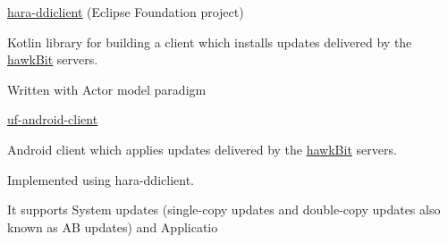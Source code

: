\newpage
{}


\begin{cventries}

  \cventry
    {\href{https://github.com/eclipse-hara/hara-ddiclient}{\underline{hara-ddiclient}} (Eclipse Foundation project)} %
    {} %
    {} %
    {} %
    {
    \begin{cvitems}
    		\item Kotlin library for building a client which installs updates delivered by the \href{https://eclipse.dev/hawkit/}{\underline{hawkBit}} servers.
    		\item Written with Actor model paradigm
    \end{cvitems}
    }

  \cventry
    {\href{https://github.com/Kynetics/uf-android-client}{\underline{uf-android-client}}} %
    {} %
    {} %
    {} %
    {
    \begin{cvitems}
      \item Android client which applies updates delivered by the \href{https://eclipse.dev/hawkit/}{\underline{hawkBit}} servers.
    	  \item Implemented using hara-ddiclient.
    	  \item It supports System updates (single-copy updates and double-copy updates also known as AB updates) and Applicatio 
    \end{cvitems}
    }

\end{cventries}
